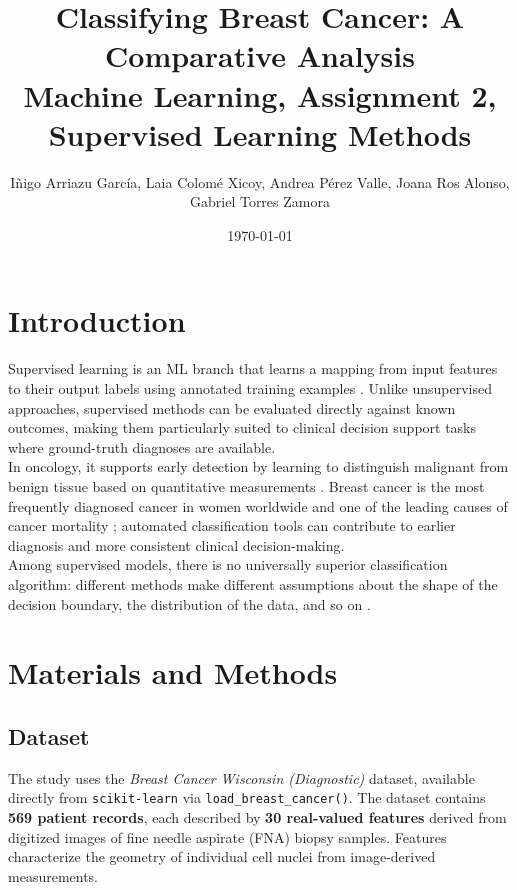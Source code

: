 \documentclass[twocolumn, fontsize=10pt]{article}
\title{
\Large
\centering
\textbf{Classifying Breast Cancer: A Comparative Analysis} \\
[8pt]
\Large \textcolor{RCharcoal}{Machine Learning, Assignment 2, Supervised Learning Methods} \\[10pt]}
\date{\today}
\author{{\normalsize I\~nigo Arriazu Garc\'ia, Laia Colom\'e Xicoy, Andrea P\'erez Valle, Joana Ros Alonso, Gabriel Torres Zamora }}
\makeatletter
\renewcommand{\maketitle}{\bgroup\setlength{\parindent}{0pt}
\begin{flushleft}
  \@title
  \@author \\
  \@date
\end{flushleft}\egroup
}
\makeatother
\begin{document}
\twocolumn[ \maketitle ]



\section{Introduction}
\label{sec:intro}

{Supervised learning} is an ML branch that learns a mapping from input features to their output labels using annotated training examples \citep{hastie2009elements}. Unlike unsupervised approaches, supervised methods can be evaluated directly against known outcomes, making them particularly suited to clinical decision support tasks where ground-truth diagnoses are available.\\

In oncology, it supports early detection by learning to distinguish malignant from benign tissue based on quantitative measurements \citep{bishop2006pattern}. Breast cancer is the most frequently diagnosed cancer in women worldwide and one of the leading causes of cancer mortality \citep{siegel2023cancer}; automated classification tools can contribute to earlier diagnosis and more consistent clinical decision-making.\\

Among supervised models, there is no universally superior classification algorithm: different methods make different assumptions about the shape of the decision boundary, the distribution of the data, and so on \citep{james2021statistical}. 



\section{Materials and Methods}
\label{sec:methods}



\subsection{Dataset}

The study uses the {\textit{Breast Cancer Wisconsin (Diagnostic)}} dataset, available directly from \texttt{scikit-learn} via \texttt{load\_breast\_cancer()}. The dataset contains \textbf{569 patient records}, each described by \textbf{30 real-valued features} derived from digitized images of fine needle aspirate (FNA) biopsy samples. Features characterize the geometry of individual cell nuclei from image-derived measurements.\\
\end{document}

